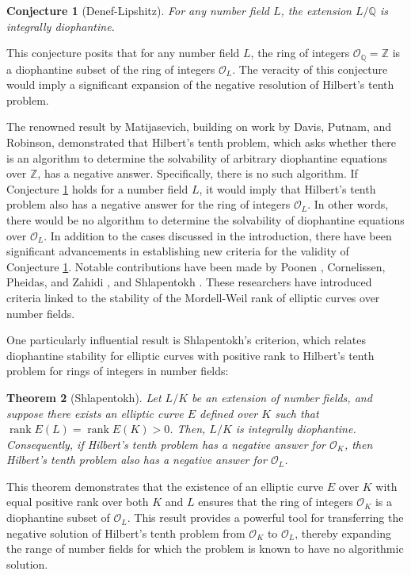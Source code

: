 \documentclass[12pt]{amsart}
\newtheorem{theorem}{Theorem}[section]
\newtheorem{conjecture}[theorem]{Conjecture}
\newcommand{\Z}{\mathbb{Z}}
\newcommand{\Q}{\mathbb{Q}}
\newcommand{\cO}{\mathcal{O}}
\numberwithin{equation}{section}
\begin{document}
\begin{conjecture}[Denef-Lipshitz]\label{denef lipchitz conjecture}
For any number field $ L $, the extension $ L/\Q $ is integrally diophantine.
\end{conjecture}

This conjecture posits that for any number field $ L $, the ring of integers $\cO_\Q = \Z$ is a diophantine subset of the ring of integers $\cO_L$. The veracity of this conjecture would imply a significant expansion of the negative resolution of Hilbert's tenth problem. 

The renowned result by Matijasevich, building on work by Davis, Putnam, and Robinson, demonstrated that Hilbert's tenth problem, which asks whether there is an algorithm to determine the solvability of arbitrary diophantine equations over $\Z$, has a negative answer. Specifically, there is no such algorithm. If Conjecture \ref{denef lipchitz conjecture} holds for a number field $ L $, it would imply that Hilbert's tenth problem also has a negative answer for the ring of integers $\cO_L$. In other words, there would be no algorithm to determine the solvability of diophantine equations over $\cO_L$. In addition to the cases discussed in the introduction, there have been significant advancements in establishing new criteria for the validity of Conjecture \ref{denef lipchitz conjecture}. Notable contributions have been made by Poonen \cite{poonen2002using}, Cornelissen, Pheidas, and Zahidi \cite{cornelissen2005division}, and Shlapentokh \cite{shlapentokh2008elliptic}. These researchers have introduced criteria linked to the stability of the Mordell-Weil rank of elliptic curves over number fields.

One particularly influential result is Shlapentokh's criterion, which relates diophantine stability for elliptic curves with positive rank to Hilbert's tenth problem for rings of integers in number fields:

\begin{theorem}[Shlapentokh]\label{shlap 1}
Let $ L/K $ be an extension of number fields, and suppose there exists an elliptic curve $ E $ defined over $ K $ such that $\operatorname{rank} E(L) = \operatorname{rank} E(K) > 0$. Then, $ L/K $ is integrally diophantine. Consequently, if Hilbert's tenth problem has a negative answer for $\cO_K$, then Hilbert's tenth problem also has a negative answer for $\cO_L$.
\end{theorem}

This theorem demonstrates that the existence of an elliptic curve $ E $ over $ K $ with equal positive rank over both $ K $ and $ L $ ensures that the ring of integers $\cO_K$ is a diophantine subset of $\cO_L$. This result provides a powerful tool for transferring the negative solution of Hilbert's tenth problem from $\cO_K$ to $\cO_L$, thereby expanding the range of number fields for which the problem is known to have no algorithmic solution.
\end{document}
